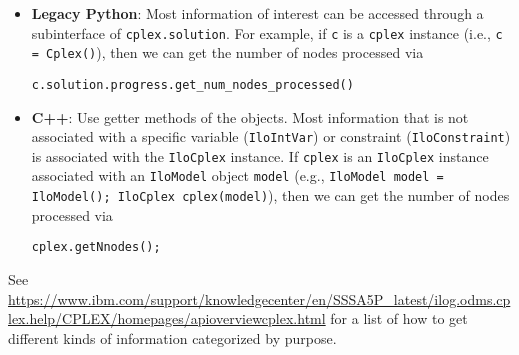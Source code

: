 \documentclass[12pt]{article}
\begin{document}
\begin{itemize}
\begin{itemize}
            \item \textbf{Legacy Python}: Most information of interest can be accessed through a subinterface of \texttt{cplex.solution}. For example, if \texttt{c} is a \texttt{cplex} instance (i.e., \texttt{c = Cplex()}), then we can get the number of nodes processed via
\begin{verbatim}
c.solution.progress.get_num_nodes_processed()
\end{verbatim}
            \item \textbf{C++}: Use getter methods of the objects. Most information that is not associated with a specific variable (\texttt{IloIntVar}) or constraint (\texttt{IloConstraint}) is associated with the \texttt{IloCplex} instance. If \texttt{cplex} is an \texttt{IloCplex} instance associated with an \texttt{IloModel} object \texttt{model} (e.g., \texttt{IloModel model = IloModel(); IloCplex cplex(model)}), then we can get the number of nodes processed via
\begin{verbatim}
cplex.getNnodes();
\end{verbatim}
        \end{itemize}
        See \url{https://www.ibm.com/support/knowledgecenter/en/SSSA5P_latest/ilog.odms.cplex.help/CPLEX/homepages/apioverviewcplex.html} for a list of how to get different kinds of information categorized by purpose.
\end{itemize}
\end{document}
